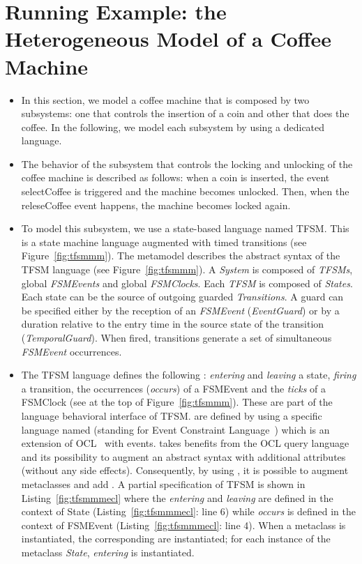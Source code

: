 \section{Running Example: the Heterogeneous Model of a Coffee Machine}
\label{sec:runningexample}
\begin{itemize}
	\item In this section, we model a coffee machine that is composed by two subsystems: one that controls the insertion of a coin and other that does the coffee. In the following, we model each subsystem by using a dedicated language.
	
	\item The behavior of the subsystem that controls the locking and unlocking of the coffee machine is described as follows: when a coin is inserted, the event selectCoffee is triggered and the machine becomes unlocked. Then, when the releseCoffee event happens, the machine becomes locked again. 
	\item To model this subsystem, we use a state-based language named TFSM. This is a state machine language augmented with timed transitions (see Figure~\ref{fig:tfsmmm}). The metamodel describes the abstract syntax of the TFSM language (see Figure~\ref{fig:tfsmmm}). A \emph{System} is composed of \emph{TFSMs}, global \emph{FSMEvents} and global \emph{FSMClocks}. Each \emph{TFSM} is composed of \emph{States}. Each state can be the source of outgoing guarded \emph{Transitions}. A guard can be specified either by the reception of an \emph{FSMEvent} (\emph{EventGuard}) or by a duration relative to the entry time in the source state of the transition (\emph{TemporalGuard}). When fired, transitions generate a set of simultaneous \emph{FSMEvent} occurrences.
	
	\item The TFSM language defines the following \dse: \emph{entering} and \emph{leaving} a state, \emph{firing} a transition, the occurrences (\emph{occurs}) of a FSMEvent and the \emph{ticks} of a FSMClock (see at the top of Figure~\ref{fig:tfsmmm}). These \dse are part of the language behavioral interface of TFSM. \dse are defined by using a specific language named \ecl (standing for Event Constraint Language~\cite{ECL}) which is an extension of OCL~\cite{omgocl2} with events. \ecl takes benefits from the OCL query language and its possibility to augment an abstract syntax with additional attributes (without any side effects). Consequently, by using \ecl, it is possible to augment \as metaclasses and add \dse. A partial \ecl specification of TFSM is shown in Listing~\ref{fig:tfsmmmecl} where the \dse \textit{entering} and \textit{leaving} are defined in the context of State (Listing~\ref{fig:tfsmmmecl}: line 6) while \textit{occurs} is defined in the context of FSMEvent (Listing~\ref{fig:tfsmmmecl}: line 4). When a metaclass is instantiated, the corresponding \dse are instantiated; \eg for each instance of the metaclass \emph{State}, \dse \textit{entering} is instantiated. 
	

\end{itemize}
